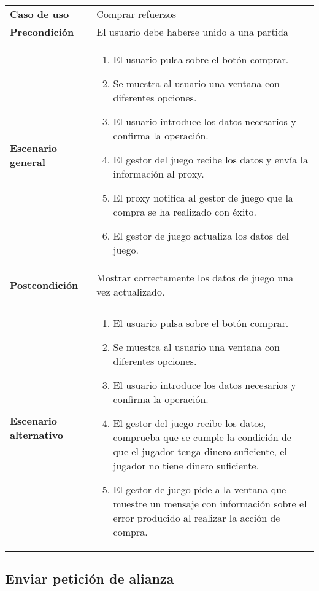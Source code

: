 {\footnotesize
\begin{tabularx}{0.95\textwidth}{p{}|X}

\textbf{Caso de uso} & Comprar refuerzos \\

\textbf{Precondición} & El usuario debe haberse unido a una partida \\

\textbf{Escenario general} & \begin{enumerate}
\item El usuario pulsa sobre el botón comprar.
\item Se muestra al usuario una ventana con diferentes opciones.
\item El usuario introduce los datos necesarios y confirma la operación.
\item El gestor del juego recibe los datos y env\'ia la información al proxy.
\item El proxy notifica al gestor de juego que la compra se ha realizado con
\'exito.
\item El gestor de juego actualiza los datos del juego.
\end{enumerate} \\
\textbf{Postcondición} & Mostrar correctamente los datos de juego una vez
actualizado.\\ \\
\textbf{Escenario alternativo} & \begin{enumerate}
\item El usuario pulsa sobre el botón comprar.
\item Se muestra al usuario una ventana con diferentes opciones.
\item El usuario introduce los datos necesarios y confirma la operación.
\item El gestor del juego recibe los datos, comprueba que se cumple la condición
de que el jugador tenga dinero suficiente, el jugador no tiene dinero
suficiente.
\item El gestor de juego pide a la ventana que muestre un mensaje con
información sobre el error producido al realizar la acción de compra.
\end{enumerate}\\
\end{tabularx}
}

\subsection{Enviar petición de alianza}

